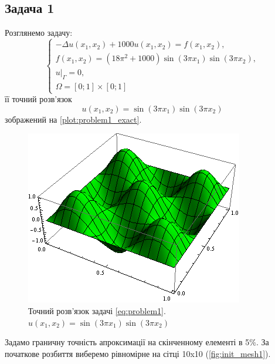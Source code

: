 
\subsection{Задача 1}

Розглянемо задачу:
\begin{equation}\label{eq:problem1}
\begin{cases}
	- \Delta u(x_1,x_2) + 1000u(x_1, x_2) = f(x_1,x_2), \\
	f(x_1,x_2) = (18 \pi^2 +1000)\sin(3 \pi x_1) \sin (3 \pi x_2), \\
	u|_\Gamma = 0 ,\\
	\Omega = \left[0;1\right] \times \left[0;1\right]
\end{cases}
\end{equation}
її точний розв'язок
\begin{equation}
	u(x_1,x_2) = \sin(3 \pi x_1) \sin (3 \pi x_2)
\end{equation}
зображений на \autoref{plot:problem1_exact}.
\begin{figure}[H]
	\centering
    \includegraphics[scale=1.0]{problem1/ExactSolution}
    \caption{Точний розв'язок задачі \eqref{eq:problem1}. $u(x_1,x_2) = \sin(3 \pi x_1) \sin (3 \pi x_2)$}
    \label{plot:problem1_exact}
\end{figure}
Задамо граничну точність апроксимації на скінченному елементі в 5\%.
За початкове розбиття виберемо рівномірне на сітці 10x10 (\autoref{fig:init_mesh1}).
